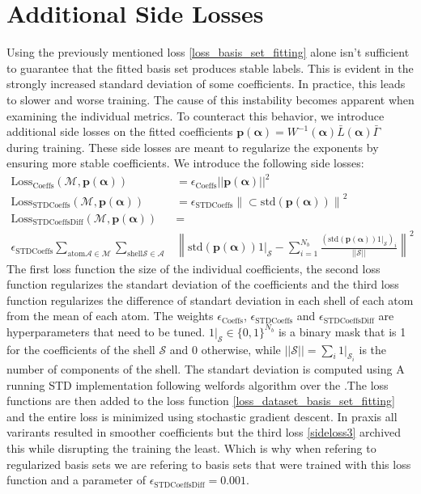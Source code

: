 \section{Additional Side Losses}
Using the previously mentioned loss \ref{loss_basis_set_fitting} alone isn't sufficient to guarantee that the fitted basis set produces stable labels. This is evident in the strongly increased standard deviation of some coefficients. In practice, this leads to slower and worse training. The cause of this instability becomes apparent when examining the individual metrics.
To counteract this behavior, we introduce additional side losses on the fitted coefficients $\mathbf{p}(\mathbf{\alpha}) = W^{-1}(\mathbf{\alpha}) \bar L(\mathbf{\alpha}) \bar \Gamma$ during training. These side losses are meant to regularize the exponents by ensuring more stable coefficients. We introduce the following side losses:
 \begin{align}
    \text{Loss}_\text{Coeffs}(\mathcal{M},\mathbf{p}(\mathbf{\alpha})) &= \epsilon_\text{Coeffs}||\mathbf{p}(\mathbf{\alpha})||^2\\
    \text{Loss}_\text{STDCoeffs}(\mathcal{M},\mathbf{p}(\mathbf{\alpha})) &= \epsilon_\text{STDCoeffs}\left\lVert\subset{\text{}}{\text{std}}(\mathbf{p}(\mathbf{\alpha}))\right\rVert^2\\
    \text{Loss}_\text{STDCoeffsDiff}(\mathcal{M},\mathbf{p}(\mathbf{\alpha})) &=\label{sideloss3}\\ \nonumber\epsilon_\text{STDCoeffs}\sum\limits_{\text{atom} \mathcal{A}\in \mathcal{M}}\sum\limits_{\text{shell} \mathcal{S}\in \mathcal{A}}&\left\lVert \text{std}(\mathbf{p}(\mathbf{\alpha}))1|_{\mathcal{S}}-\sum\limits_{i=1}^{N_b}\frac{\left(\text{std}(\mathbf{p}(\mathbf{\alpha}))1|_{\mathcal{S}}\right)_i}{||\mathcal{S}||}\right\rVert^2
 \end{align}
The first loss function the size of the individual coefficients, the second loss function regularizes the standart deviation of the coefficients and the third loss function regularizes the difference of standart deviation in each shell of each atom from the mean of each atom. The weights $\epsilon_\text{Coeffs}$, $\epsilon_\text{STDCoeffs}$ and $\epsilon_\text{STDCoeffsDiff}$ are hyperparameters that need to be tuned. $1|_{\mathcal{S}}\in \{0,1\}^{N_b}$ is a binary mask that is 1 for the coefficients of the shell $\mathcal{S}$ and 0 otherwise, while $||\mathcal{S}|| = \sum_i 1|_{\mathcal{S}}_i$ is the number of components of the shell. The standart deviation is computed using A running STD implementation following welfords algorithm \cite{Welford} over the .The loss functions are then added to the loss function \eqref{loss_dataset_basis_set_fitting} and the entire loss is minimized using stochastic gradient descent. In praxis all varirants resulted in smoother coefficients but the third loss \eqref{sideloss3} archived this while disrupting the training the least. Which is why when refering to regularized basis sets we are refering to basis sets that were trained with this loss function and a parameter of $\epsilon_\text{STDCoeffsDiff}=0.001$.\\


